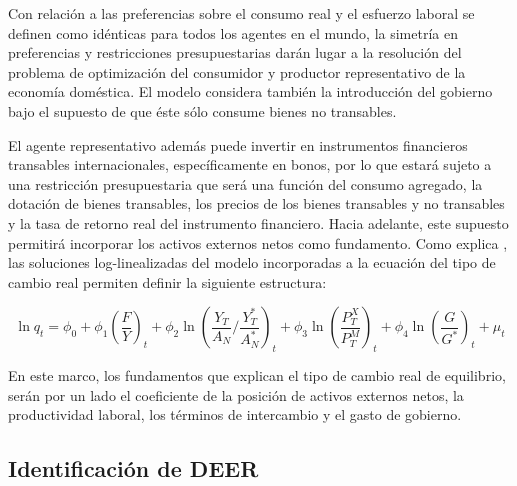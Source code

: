 \documentclass[12pt,letterpaper]{article}
\begin{document}
Con relación a las preferencias sobre el consumo real y el esfuerzo laboral se definen como idénticas para todos los agentes en el mundo, la simetría en preferencias y restricciones presupuestarias darán lugar a la resolución del problema de optimización del consumidor y productor representativo de la economía doméstica. El modelo considera también la introducción del gobierno bajo el supuesto de que éste sólo consume bienes no transables.  

El agente representativo además puede invertir en instrumentos financieros transables internacionales, específicamente en bonos, por lo que estará sujeto a una restricción presupuestaria que será una función del consumo agregado, la dotación de bienes transables, los precios de los bienes transables y no transables y la tasa de retorno real del instrumento financiero. Hacia adelante, este supuesto permitirá incorporar los activos externos netos como fundamento. Como explica \cite{Calderon2002panel}, las soluciones log-linealizadas del modelo incorporadas a la ecuación del tipo de cambio real permiten definir la siguiente estructura: 

\begin{equation}
\ln q_t=\phi_0+\phi_1\left(\frac{F}{Y}\right)_t+\phi_2\ln\left(\frac{Y_T}{A_N} / \frac{Y_T^*}{A_N^*}\right)_t+\phi_3\ln\left(\frac{P_T^X}{P_T^M}\right)_t+\phi_4\ln\left(\frac{G}{G^*}\right)_t+\mu_t
\end{equation}

En este marco, los fundamentos que explican el tipo de cambio real de equilibrio, serán por un lado el coeficiente de la posición de activos externos netos, la productividad laboral, los términos de intercambio y el gasto de gobierno.  

\subsection*{Identificación de DEER}
\end{document}
